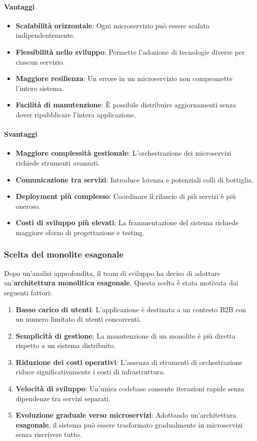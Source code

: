 \paragraph{Vantaggi}  
\begin{itemize}
    \item \textbf{Scalabilità orizzontale}: Ogni microservizio può essere scalato indipendentemente.
    \item \textbf{Flessibilità nello sviluppo}: Permette l’adozione di tecnologie diverse per ciascun servizio.
    \item \textbf{Maggiore resilienza}: Un errore in un microservizio non compromette l’intero sistema.
    \item \textbf{Facilità di manutenzione}: È possibile distribuire aggiornamenti senza dover ripubblicare l’intera applicazione.
\end{itemize}
\paragraph{Svantaggi}  
\begin{itemize}
    \item \textbf{Maggiore complessità gestionale}: L’orchestrazione dei microservizi richiede strumenti avanzati.
    \item \textbf{Comunicazione tra servizi}: Introduce latenza e potenziali colli di bottiglia.
    \item \textbf{Deployment più complesso}: Coordinare il rilascio di più servizi è più oneroso.
    \item \textbf{Costi di sviluppo più elevati}: La frammentazione del sistema richiede maggiore sforzo di progettazione e testing.
\end{itemize}

\subsubsection{Scelta del monolite esagonale}
Dopo un’analisi approfondita, il team di sviluppo ha deciso di adottare un’\textbf{architettura monolitica esagonale}. Questa scelta è stata motivata dai seguenti fattori:
\begin{enumerate}
    \item \textbf{Basso carico di utenti}: L’applicazione è destinata a un contesto B2B con un numero limitato di utenti concorrenti.
    \item \textbf{Semplicità di gestione}: La manutenzione di un monolite è più diretta rispetto a un sistema distribuito.
    \item \textbf{Riduzione dei costi operativi}: L’assenza di strumenti di orchestrazione riduce significativamente i costi di infrastruttura.
    \item \textbf{Velocità di sviluppo}: Un’unica codebase consente iterazioni rapide senza dipendenze tra servizi separati.
    \item \textbf{Evoluzione graduale verso microservizi}: Adottando un’architettura \textbf{esagonale}, il sistema può essere trasformato gradualmente in microservizi senza riscrivere tutto.
\end{enumerate}

